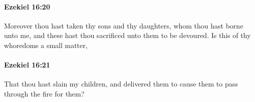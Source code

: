 		\paragraph{Ezekiel 16:20} %
			\label{EZEKIEL-16-20}

			Moreover thou hast taken thy sons and thy daughters, whom thou hast borne unto me, and these hast thou sacrificed unto them to be devoured. Is this of thy whoredoms a small matter,


		\paragraph{Ezekiel 16:21} %
			\label{EZEKIEL-16-21}

			That thou hast slain my children, and delivered them to cause them to pass through the fire for them?


